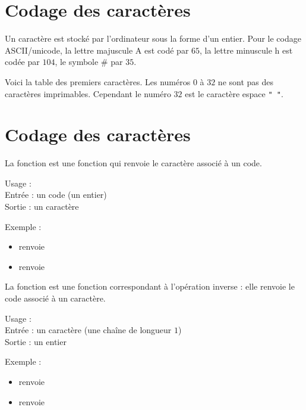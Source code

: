 \documentclass[12pt,class=report,crop=false]{standalone}
\begin{document}
\section*{Codage des caractères}


Un caractère est stocké par l'ordinateur sous la forme d'un entier.
Pour le codage ASCII/unicode, la lettre majuscule \og{}A\fg{} est codé par $65$, la lettre minuscule \og{}h\fg{} est codée par $104$, le symbole \og{}\#\fg{} par $35$.

Voici la table des premiers caractères. Les numéros $0$ à $32$ ne sont pas des caractères imprimables. Cependant le numéro $32$ est le caractère espace \lstinline!" "!.




\newpage

\section*{Codage des caractères}

La fonction  est une fonction \Python{} qui renvoie le caractère associé à un code.
  
  \begin{fonctionpython}
  Usage : \\
   Entrée : un code (un entier)\\
   Sortie : un caractère
  
  \medskip
     
   Exemple :
  \begin{itemize}  
    \item {} renvoie 
    \item {} renvoie 
  \end{itemize} 
  \end{fonctionpython} 
  
\bigskip


La fonction  est une fonction \Python{} correspondant à l'opération inverse : elle renvoie le code associé à un caractère.
  
  \begin{fonctionpython}
  Usage : \\
   Entrée : un caractère (une chaîne de longueur $1$)\\
   Sortie : un entier
  
  \medskip
     
   Exemple :
  \begin{itemize}  
    \item {} renvoie 
    \item {} renvoie 
  \end{itemize} 
  \end{fonctionpython}  
\end{document}

